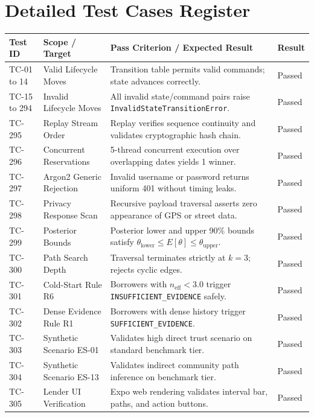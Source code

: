 \chapter{Detailed Test Cases Register}
\label{app:test_cases_register}

\begin{longtable}{p{2cm} p{4.5cm} p{5.5cm} l}
\toprule
\textbf{Test ID} & \textbf{Scope / Target} & \textbf{Pass Criterion / Expected Result} & \textbf{Result} \\
\midrule
\endhead
\bottomrule
\endfoot
TC-01 to 14 & Valid Lifecycle Moves & Transition table permits valid commands; state advances correctly. & Passed \\
TC-15 to 294 & Invalid Lifecycle Moves & All invalid state/command pairs raise \texttt{InvalidStateTransitionError}. & Passed \\
TC-295 & Replay Stream Order & Replay verifies sequence continuity and validates cryptographic hash chain. & Passed \\
TC-296 & Concurrent Reservations & 5-thread concurrent execution over overlapping dates yields 1 winner. & Passed \\
TC-297 & Argon2 Generic Rejection & Invalid username or password returns uniform 401 without timing leaks. & Passed \\
TC-298 & Privacy Response Scan & Recursive payload traversal asserts zero appearance of GPS or street data. & Passed \\
TC-299 & Posterior Bounds & Posterior lower and upper 90\% bounds satisfy $\theta_{\text{lower}} \le E[\theta] \le \theta_{\text{upper}}$. & Passed \\
TC-300 & Path Search Depth & Traversal terminates strictly at $k = 3$; rejects cyclic edges. & Passed \\
TC-301 & Cold-Start Rule R6 & Borrowers with $n_{\text{eff}} < 3.0$ trigger \texttt{INSUFFICIENT\_EVIDENCE} safely. & Passed \\
TC-302 & Dense Evidence Rule R1 & Borrowers with dense history trigger \texttt{SUFFICIENT\_EVIDENCE}. & Passed \\
TC-303 & Synthetic Scenario ES-01 & Validates high direct trust scenario on standard benchmark tier. & Passed \\
TC-304 & Synthetic Scenario ES-13 & Validates indirect community path inference on benchmark tier. & Passed \\
TC-305 & Lender UI Verification & Expo web rendering validates interval bar, paths, and action buttons. & Passed \\
\end{longtable}
